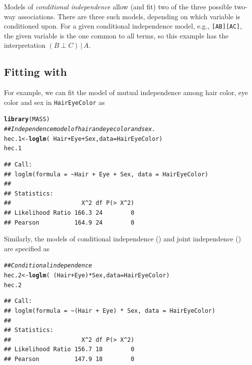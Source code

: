 \documentclass[10pt,twoside]{article}\usepackage[]{graphicx}\usepackage[]{color}
\makeatletter
\newcommand{\hlcom}[1]{\textcolor[rgb]{0.678,0.584,0.686}{\textit{#1}}}%
\newcommand{\hlopt}[1]{\textcolor[rgb]{0,0,0}{#1}}%
\newcommand{\hlstd}[1]{\textcolor[rgb]{0.345,0.345,0.345}{#1}}%
\newcommand{\hlkwb}[1]{\textcolor[rgb]{0.69,0.353,0.396}{#1}}%
\newcommand{\hlkwc}[1]{\textcolor[rgb]{0.333,0.667,0.333}{#1}}%
\newcommand{\hlkwd}[1]{\textcolor[rgb]{0.737,0.353,0.396}{\textbf{#1}}}%
\newenvironment{kframe}{%
 \def\at@end@of@kframe{}%
 \ifinner\ifhmode%
  \def\at@end@of@kframe{\end{minipage}}%
  \begin{minipage}{\columnwidth}%
 \fi\fi%
 \def\FrameCommand##1{\hskip\@totalleftmargin \hskip-\fboxsep
 \colorbox{shadecolor}{##1}\hskip-\fboxsep
     \hskip-\linewidth \hskip-\@totalleftmargin \hskip\columnwidth}%
 \MakeFramed {\advance\hsize-\width
   \@totalleftmargin\z@ \linewidth\hsize
   \@setminipage}}%
 {\par\unskip\endMakeFramed%
 \at@end@of@kframe}
\newenvironment{knitrout}{}{} %
\newcommand*{\given}{\ensuremath{\, | \,}}
\newcommand{\data}[1]{\texttt{#1}}
\newcommand{\codefun}[1]{\code{#1()}}
\makeatother
\begin{document}
Models of \emph{conditional independence} allow (and fit)  two of the three possible
two-way associations.  There are three such models, depending on which variable is conditioned upon.
For a given conditional independence model, e.g., \texttt{[AB][AC]}, the given variable is the one
common to all terms, so this example has the interpretation $(B \perp C) \given A$.


\subsection[Fitting with loglm()]{Fitting with \codefun{loglm}}\label{sec:loglm}
For example, we can fit the model of mutual independence among hair color, eye color and sex 
in \data{HairEyeColor} as

\begin{knitrout}
\color{fgcolor}\begin{kframe}
\begin{alltt}
\hlkwd{library}\hlstd{(MASS)}
\hlcom{## Independence model of hair and eye color and sex.  }
\hlstd{hec.1} \hlkwb{<-} \hlkwd{loglm}\hlstd{(}\hlopt{~}\hlstd{Hair}\hlopt{+}\hlstd{Eye}\hlopt{+}\hlstd{Sex,} \hlkwc{data}\hlstd{=HairEyeColor)}
\hlstd{hec.1}
\end{alltt}
\begin{verbatim}
## Call:
## loglm(formula = ~Hair + Eye + Sex, data = HairEyeColor)
## 
## Statistics:
##                    X^2 df P(> X^2)
## Likelihood Ratio 166.3 24        0
## Pearson          164.9 24        0
\end{verbatim}
\end{kframe}
\end{knitrout}


Similarly, the models of conditional independence () 
and joint independence () are specified as
\begin{knitrout}
\color{fgcolor}\begin{kframe}
\begin{alltt}
\hlcom{## Conditional independence}
\hlstd{hec.2} \hlkwb{<-} \hlkwd{loglm}\hlstd{(}\hlopt{~}\hlstd{(Hair} \hlopt{+} \hlstd{Eye)} \hlopt{*} \hlstd{Sex,} \hlkwc{data}\hlstd{=HairEyeColor)}
\hlstd{hec.2}
\end{alltt}
\begin{verbatim}
## Call:
## loglm(formula = ~(Hair + Eye) * Sex, data = HairEyeColor)
## 
## Statistics:
##                    X^2 df P(> X^2)
## Likelihood Ratio 156.7 18        0
## Pearson          147.9 18        0
\end{verbatim}
\end{kframe}
\end{knitrout}
\end{document}

